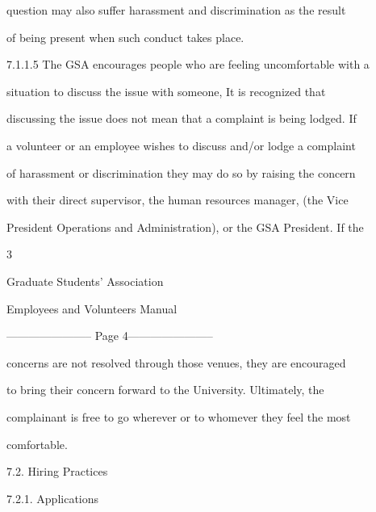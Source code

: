          question  may  also  suffer harassment  and  discrimination  as  the  result  

         of being present when such conduct takes place.  



  



7.1.1.5 The  GSA  encourages  people  who  are  feeling  uncomfortable  with  a  

         situation   to  discuss  the  issue  with  someone,  It  is  recognized  that  

         discussing the issue does not mean that a complaint is being lodged. If  

         a volunteer or an employee wishes to discuss and/or lodge a complaint  

         of harassment or discrimination they may do so by raising the concern  

        with  their  direct  supervisor,  the  human  resources  manager, (the Vice  

        President Operations and Administration), or the GSA President. If the  



                                                   3  

  

                              Graduate Students’ Association  

                            Employees and Volunteers Manual  


----------------------- Page 4-----------------------

         concerns  are not  resolved  through  those  venues,  they  are  encouraged  

         to  bring  their  concern  forward  to  the  University.    Ultimately,  the  

         complainant is free  to go wherever or to whomever they feel the most  

         comfortable.  



                          



                                        7.2.      Hiring Practices  



          7.2.1. Applications  



            



